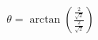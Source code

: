 \documentclass[preview]{standalone}
\begin{document}
\begin{align*}
\theta = \arctan\left(\frac{\frac{2}{\sqrt{2}}}{\frac{2}{\sqrt{2}}}\right)
\end{align*}
\end{document}
